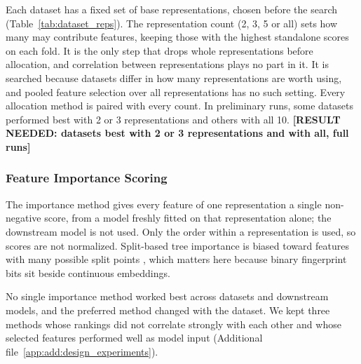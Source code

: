 Each dataset has a fixed set of base representations, chosen before the search (Table~\ref{tab:dataset_reps}). The representation count (2, 3, 5 or all) sets how many may contribute features, keeping those with the highest standalone scores on each fold. It is the only step that drops whole representations before allocation, and correlation between representations plays no part in it. It is searched because datasets differ in how many representations are worth using, and pooled feature selection over all representations has no such setting. Every allocation method is paired with every count. In preliminary runs, some datasets performed best with 2 or 3 representations and others with all 10. \textbf{[RESULT NEEDED: datasets best with 2 or 3 representations and with all, full runs]}

\subsubsection{Feature Importance Scoring}



The importance method gives every feature of one representation a single non-negative score, from a model freshly fitted on that representation alone; the downstream model is not used. Only the order within a representation is used, so scores are not normalized. Split-based tree importance is biased toward features with many possible split points \citep{Strobl2007}, which matters here because binary fingerprint bits sit beside continuous embeddings.

No single importance method worked best across datasets and downstream models, and the preferred method changed with the dataset. We kept three methods whose rankings did not correlate strongly with each other and whose selected features performed well as model input (Additional file~\ref{app:add:design_experiments}).

